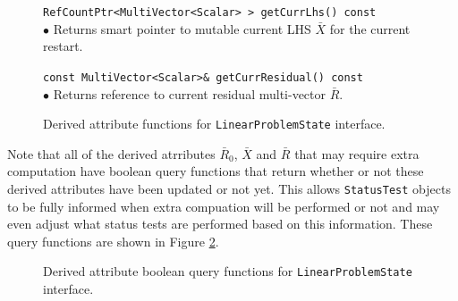 \documentclass[pdf,ps2pdf,11pt]{SANDreport}
\begin{document}
\begin{enumerate}
\begin{figure}
{\begin{minipage}{\textwidth}
{\scriptsize{}\noindent{}\texttt{RefCountPtr<MultiVector<Scalar> >
getCurrLhs() const}} \\ $\bullet$ Returns smart pointer to mutable
current LHS $\bar{X}$ for the current restart.

{\scriptsize{}\noindent{}\texttt{const MultiVector<Scalar>\&
getCurrResidual() const}} \\ $\bullet$ Returns reference to current
residual multi-vector $\bar{R}$.

\end{minipage}
} %

\caption{\label{fig:LinearProblemState-functions}
Derived attribute functions for {}\texttt{Linear\-Problem\-State}
interface.  }

\end{figure}

Note that all of the derived atrributes $\bar{R}_0$, $\bar{X}$ and
$\bar{R}$ that may require extra computation have boolean query
functions that return whether or not these derived attributes have
been updated or not yet.  This allows {}\texttt{Status\-Test} objects
to be fully informed when extra compuation will be performed or not
and may even adjust what status tests are performed based on this
information.  These query functions are shown in Figure
{}\ref{fig:LinearProblemState-bool-functions}.

\begin{figure}


\caption{\label{fig:LinearProblemState-bool-functions}
Derived attribute boolean query functions for
{}\texttt{Linear\-Problem\-State} interface.  }


\end{figure}
\end{enumerate}
\end{document}
